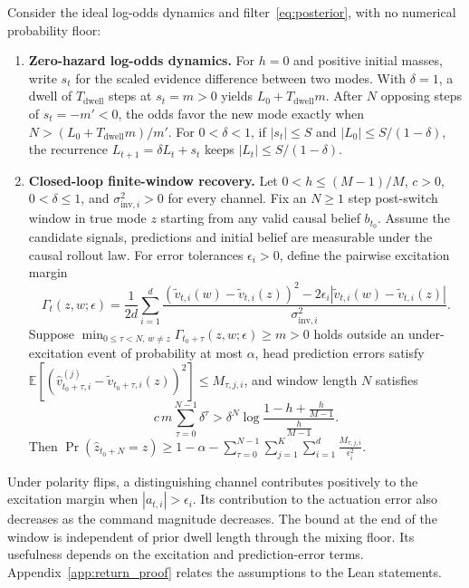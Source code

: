 \documentclass[twoside,11pt]{article}
\begin{document}
\begin{theorem}
\label{thm:filter_recovery}
Consider the ideal log-odds dynamics and filter~\eqref{eq:posterior}, with no numerical probability floor:
\begin{enumerate}[leftmargin=*]
    \item \textbf{Zero-hazard log-odds dynamics.} For $h=0$ and positive initial masses, write $s_t$ for the scaled evidence difference between two modes. With $\delta=1$, a dwell of $T_{\mathrm{dwell}}$ steps at $s_t=m>0$ yields $L_0+T_{\mathrm{dwell}}m$. After $N$ opposing steps of $s_t=-m'<0$, the odds favor the new mode exactly when $N>(L_0+T_{\mathrm{dwell}}m)/m'$. For $0<\delta<1$, if $|s_t|\le S$ and $|L_0|\le S/(1-\delta)$, the recurrence $L_{t+1}=\delta L_t+s_t$ keeps $|L_t|\le S/(1-\delta)$.
    \item \textbf{Closed-loop finite-window recovery.} Let $0<h\le (M-1)/M$, $c>0$, $0<\delta\le 1$, and $\sigma_{\mathrm{inv},i}^2>0$ for every channel. Fix an $N\ge 1$ step post-switch window in true mode $z$ starting from any valid causal belief $b_{t_0}$. Assume the candidate signals, predictions and initial belief are measurable under the causal rollout law. For error tolerances $\epsilon_i>0$, define the pairwise excitation margin
    \begin{equation}
        \Gamma_t(z,w;\epsilon)
        = \frac{1}{2d}\sum_{i=1}^d
        \frac{(\tilde v_{t,i}(w)-\tilde v_{t,i}(z))^2
              -2\epsilon_i|\tilde v_{t,i}(w)-\tilde v_{t,i}(z)|}{\sigma_{\mathrm{inv},i}^2}.
        \label{eq:excitation_margin}
    \end{equation}
    Suppose $\min_{0\le\tau<N,\,w\ne z}\Gamma_{t_0+\tau}(z,w;\epsilon)\ge m>0$ holds outside an under-excitation event of probability at most $\alpha$, head prediction errors satisfy $\mathbb{E}[(\hat v_{t_0+\tau,i}^{(j)}-\tilde v_{t_0+\tau,i}(z))^2]\le M_{\tau,j,i}$, and window length $N$ satisfies
    \begin{equation}
        c\,m\sum_{\tau=0}^{N-1}\delta^\tau
        > \delta^N\log\frac{1-h+\frac{h}{M-1}}{\frac{h}{M-1}}.
        \label{eq:recovery_window_condition}
    \end{equation}
    Then $\Pr\!\left(\hat z_{t_0+N}=z\right)\ge 1-\alpha-\sum_{\tau=0}^{N-1}\sum_{j=1}^K\sum_{i=1}^d \frac{M_{\tau,j,i}}{\epsilon_i^2}$.
\end{enumerate}
\end{theorem}

Under polarity flips, a distinguishing channel contributes positively to the excitation margin when $|a_{t,i}|>\epsilon_i$. Its contribution to the actuation error also decreases as the command magnitude decreases. The bound at the end of the window is independent of prior dwell length through the mixing floor. Its usefulness depends on the excitation and prediction-error terms. Appendix~\ref{app:return_proof} relates the assumptions to the Lean statements.
\end{document}
